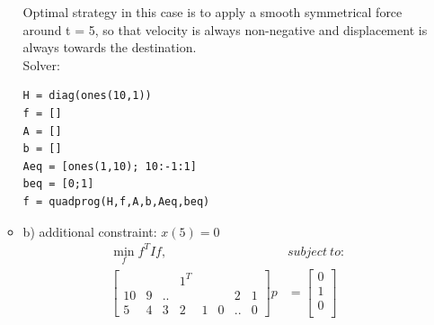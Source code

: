 \documentclass[12pt,letter]{article}
\begin{document}
\begin{enumerate}
\begin{itemize}
\begin{figure}[H]
    \end{figure}

    Optimal strategy in this case is to apply a smooth symmetrical force around t = 5, so that velocity is always non-negative and displacement is always towards the destination.\\

    Solver:
\begin{verbatim}
H = diag(ones(10,1))
f = []
A = []
b = []
Aeq = [ones(1,10); 10:-1:1]
beq = [0;1]
f = quadprog(H,f,A,b,Aeq,beq)
\end{verbatim}

    \pagebreak
    
  \item b) additional constraint: $x(5) = 0$\\
    \begin{align*}
      \min_{f} f^TIf,\ &subject\ to:\\
      \begin{bmatrix}
        & & & 1^T & & & &\\
        10 & 9 & .. &&& & 2 & 1\\
        5 & 4 & 3 & 2 & 1 & 0 & .. & 0
      \end{bmatrix} p &=
      \begin{bmatrix}
        0\\
        1\\
        0\\
      \end{bmatrix}\\
    \end{align*}


\end{itemize}
\end{enumerate}
\end{document}
